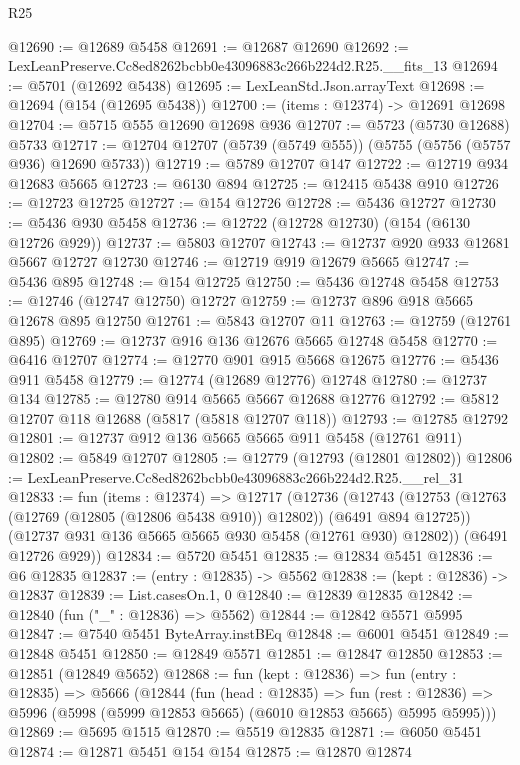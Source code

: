 \begin{lexlean}{R25}
\begin{coremodule}
@12690 := @12689 @5458
@12691 := @12687 @12690
@12692 := LexLeanPreserve.Cc8ed8262bcbb0e43096883c266b224d2.R25.__fits_13
@12694 := @5701 (@12692 @5438)
@12695 := LexLeanStd.Json.arrayText
@12698 := @12694 (@154 (@12695 @5438))
@12700 := (items : @12374) -> @12691 @12698
@12704 := @5715 @555 @12690 @12698 @936
@12707 := @5723 (@5730 @12688) @5733
@12717 := @12704 @12707 (@5739 (@5749 @555)) (@5755 (@5756 (@5757 @936) @12690 @5733))
@12719 := @5789 @12707 @147
@12722 := @12719 @934 @12683 @5665
@12723 := @6130 @894
@12725 := @12415 @5438 @910
@12726 := @12723 @12725
@12727 := @154 @12726
@12728 := @5436 @12727
@12730 := @5436 @930 @5458
@12736 := @12722 (@12728 @12730) (@154 (@6130 @12726 @929))
@12737 := @5803 @12707
@12743 := @12737 @920 @933 @12681 @5667 @12727 @12730
@12746 := @12719 @919 @12679 @5665
@12747 := @5436 @895
@12748 := @154 @12725
@12750 := @5436 @12748 @5458
@12753 := @12746 (@12747 @12750) @12727
@12759 := @12737 @896 @918 @5665 @12678 @895 @12750
@12761 := @5843 @12707 @11
@12763 := @12759 (@12761 @895)
@12769 := @12737 @916 @136 @12676 @5665 @12748 @5458
@12770 := @6416 @12707
@12774 := @12770 @901 @915 @5668 @12675
@12776 := @5436 @911 @5458
@12779 := @12774 (@12689 @12776) @12748
@12780 := @12737 @134
@12785 := @12780 @914 @5665 @5667 @12688 @12776
@12792 := @5812 @12707 @118 @12688 (@5817 (@5818 @12707 @118))
@12793 := @12785 @12792
@12801 := @12737 @912 @136 @5665 @5665 @911 @5458 (@12761 @911)
@12802 := @5849 @12707
@12805 := @12779 (@12793 (@12801 @12802))
@12806 := LexLeanPreserve.Cc8ed8262bcbb0e43096883c266b224d2.R25.__rel_31
@12833 := fun (items : @12374) =>
  @12717
    (@12736
      (@12743
        (@12753 (@12763 (@12769 (@12805 (@12806 @5438 @910)) @12802)) (@6491 @894 @12725))
        (@12737 @931 @136 @5665 @5665 @930 @5458 (@12761 @930) @12802))
      (@6491 @12726 @929))
@12834 := @5720 @5451
@12835 := @12834 @5451
@12836 := @6 @12835
@12837 := (entry : @12835) -> @5562
@12838 := (kept : @12836) -> @12837
@12839 := List.casesOn.{1, 0}
@12840 := @12839 @12835
@12842 := @12840 (fun ("_" : @12836) => @5562)
@12844 := @12842 @5571 @5995
@12847 := @7540 @5451 ByteArray.instBEq
@12848 := @6001 @5451
@12849 := @12848 @5451
@12850 := @12849 @5571
@12851 := @12847 @12850
@12853 := @12851 (@12849 @5652)
@12868 := fun (kept : @12836) =>
  fun (entry : @12835) =>
  @5666
    (@12844
      (fun (head : @12835) =>
      fun (rest : @12836) => @5996 (@5998 (@5999 @12853 @5665) (@6010 @12853 @5665) @5995 @5995)))
@12869 := @5695 @1515
@12870 := @5519 @12835
@12871 := @6050 @5451
@12874 := @12871 @5451 @154 @154
@12875 := @12870 @12874

\end{coremodule}
\end{lexlean}
